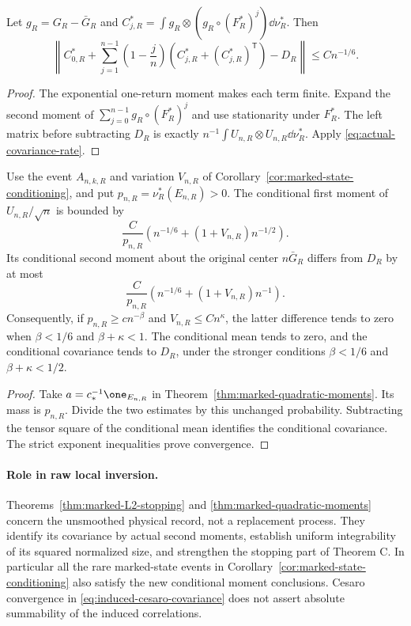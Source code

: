\begin{corollary}
\label{cor:induced-cesaro-covariance}
Let $g_R=G_R-\bar G_R$ and
$C^*_{j,R}=\int g_R\otimes(g_R\circ(F_R^*)^j)\dd\nu_R^*$.
Then
\begin{equation}\label{eq:induced-cesaro-covariance}
 \left\|C^*_{0,R}+\sum_{j=1}^{n-1}\left(1-\frac jn\right)
          (C^*_{j,R}+(C^*_{j,R})^{\mathsf T})-D_R\right\|
       \le C n^{-1/6}.
\end{equation}
\end{corollary}
\begin{proof}
The exponential one-return moment makes each term finite. Expand the
second moment of $\sum_{j=0}^{n-1}g_R\circ(F_R^*)^j$ and use stationarity
under $F_R^*$. The left matrix before subtracting $D_R$ is exactly
$n^{-1}\int U_{n,R}\otimes U_{n,R}\dd\nu_R^*$. Apply
\eqref{eq:actual-covariance-rate}.
\end{proof}

\begin{corollary}
\label{cor:marked-conditional-moments}
Use the event $A_{n,k,R}$ and variation $V_{n,R}$ of
Corollary~\ref{cor:marked-state-conditioning}, and put
$p_{n,R}=\nu_R^*(E_{n,R})>0$. The conditional first moment of
$U_{n,R}/\sqrt n$ is bounded by
\[
 \frac C{p_{n,R}}\left(n^{-1/6}+(1+V_{n,R})n^{-1/2}\right).
\]
Its conditional second moment about the original center $n\bar G_R$
differs from $D_R$ by at most
\[
 \frac C{p_{n,R}}\left(n^{-1/6}+(1+V_{n,R})n^{-1}\right).
\]
Consequently, if $p_{n,R}\ge c n^{-\beta}$ and
$V_{n,R}\le Cn^\kappa$, the latter difference tends to zero when
$\beta<1/6$ and $\beta+\kappa<1$. The conditional mean tends to zero,
and the conditional covariance tends to $D_R$, under the stronger
conditions $\beta<1/6$ and $\beta+\kappa<1/2$.
\end{corollary}
\begin{proof}
Take $a=c_*^{-1}\one_{E_{n,R}}$ in
Theorem~\ref{thm:marked-quadratic-moments}. Its mass is $p_{n,R}$.
Divide the two estimates by this unchanged probability. Subtracting
the tensor square of the conditional mean identifies the conditional
covariance. The strict exponent inequalities prove convergence.
\end{proof}

\paragraph{Role in raw local inversion.}
Theorems~\ref{thm:marked-L2-stopping} and
\ref{thm:marked-quadratic-moments} concern the unsmoothed physical
record, not a replacement process. They identify its covariance by
actual second moments, establish uniform integrability of its squared
normalized size, and strengthen the stopping part of Theorem C.
In particular all the rare marked-state events in
Corollary~\ref{cor:marked-state-conditioning} also satisfy the new
conditional moment conclusions. Cesaro convergence in
\eqref{eq:induced-cesaro-covariance} does not assert absolute summability
of the induced correlations.

